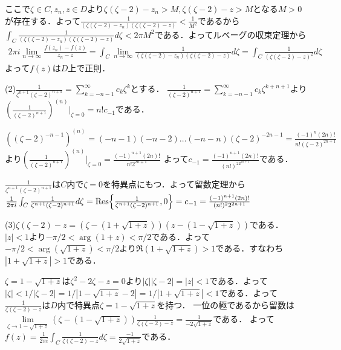 \documentclass[
		book,
		head_space=20mm,
		foot_space=20mm,
		gutter=10mm,
		line_length=190mm
]{jlreq}
\begin{document}
ここで$\zeta\in C,z_n,z \in D$より$\zeta(\zeta-2)-z_n>M,\zeta(\zeta-2)-z>M$となる$M>0$が存在する．よって$\frac{1}{(\zeta(\zeta-2)-z_n)(\zeta(\zeta-2)-z)}<\frac{1}{M^2}$であるから$\int_C \frac{1}{(\zeta(\zeta-2)-z_n)(\zeta(\zeta-2)-z)}d\zeta<2\pi M^2$である．よってルベーグの収束定理から
\begin{align}
	2\pi i\lim\limits_{n\to \infty}\frac{f(z_n)-f(z)}{z_n-z}=\int_C \lim\limits_{n\to \infty}\frac{1}{(\zeta(\zeta-2)-z_n)(\zeta(\zeta-2)-z)}d\zeta
	=\int_C \frac{1}{(\zeta(\zeta-2)-z)^2}d\zeta
\end{align}
よって$f(z)$は$D$上で正則．

(2)$\frac{1}{\zeta^{n+1}(\zeta-2)^{n+1}}=\sum_{k=-n-1}^\infty c_k\zeta^k$とする．
$\frac{1}{(\zeta-2)^{n+1}}=\sum_{k=-n-1}^\infty c_k\zeta^{k+n+1}$より
$(\frac{1}{(\zeta-2)^{n+1}})^{(n)}|_{\zeta=0}=n!c_{-1}$である．

$((\zeta-2)^{-n-1})^{(n)}=(-n-1)(-n-2)\dots(-n-n)(\zeta-2)^{-2n-1}=\frac{(-1)^n(2n)!}{n!(\zeta-2)^{2n+1}}$より$(\frac{1}{(\zeta-2)^{n+1}})^{(n)}|_{\zeta=0}=\frac{(-1)^{n+1}(2n)!}{n!2^{2n+1}}$
よって$c_{-1}=\frac{(-1)^{n+1}(2n)!}{(n!)^22^{2n+1}}$である．

$\frac{1}{\zeta^{n+1}(\zeta-2)^{n+1}}$は$C$内で$\zeta=0$を特異点にもつ．よって留数定理から$\frac{1}{2\pi i}\int_C \frac{1}{\zeta^{n+1}(\zeta-2)^{n+1}}d\zeta=\Res{\frac{1}{\zeta^{n+1}(\zeta-2)^{n+1}},0}=c_{-1}=\frac{(-1)^{n+1}(2n)!}{(n!)^22^{2n+1}}$

(3)$\zeta(\zeta-2)-z=(\zeta-(1+\sqrt{1+z}))(z-(1-\sqrt{1+z}))$である．
$|z|<1$より$-\pi/2<\arg (1+z)<\pi/2$である．よって$-\pi/2<\arg (\sqrt{1+z})<\pi/2$より$\Re(1+\sqrt{1+z})>1$である．すなわち$|1+\sqrt{1+z}|>1$である．

$\zeta=1-\sqrt{1+z}$は$\zeta^2-2\zeta-z=0$より$|\zeta||\zeta-2|=|z|<1$である．よって$|\zeta|<1/|\zeta-2|=1/|1-\sqrt{1+z}-2|=1/|1+\sqrt{1+z}|<1$である．よって
$\frac{1}{\zeta(\zeta-2)-z}$は$D$内で特異点$\zeta=1-\sqrt{1+z}$を持つ．
一位の極であるから留数は$\lim\limits_{\zeta\to 1-\sqrt{1+z}}(\zeta-(1-\sqrt{1+z}))\frac{1}{\zeta(\zeta-2)-z}=\frac{1}{-2\sqrt{1+z}}$である．
よって$f(z)=\frac{1}{2\pi i}\int_C \frac{1}{\zeta(\zeta-2)-z}d\zeta=\frac{-1}{2\sqrt{1+z}}$である．
\end{document}
